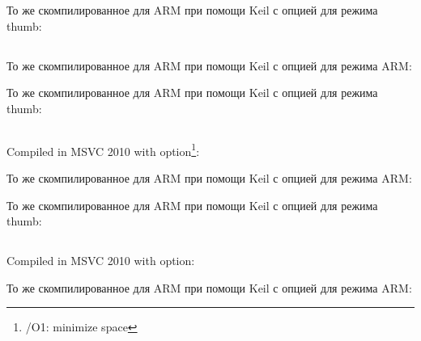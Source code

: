 То же скомпилированное для ARM при помощи Keil с опцией \Othree для режима thumb:



\subsection{}





То же скомпилированное для ARM при помощи Keil с опцией \Othree для режима ARM:



То же скомпилированное для ARM при помощи Keil с опцией \Othree для режима thumb:



\subsection{}

{Compiled in MSVC 2010 with  option\footnote{/O1: minimize space}:}



То же скомпилированное для ARM при помощи Keil с опцией \Othree для режима ARM:



То же скомпилированное для ARM при помощи Keil с опцией \Othree для режима thumb:



\subsection{}

{Compiled in MSVC 2010 with  option:}



То же скомпилированное для ARM при помощи Keil с опцией \Othree для режима ARM:

